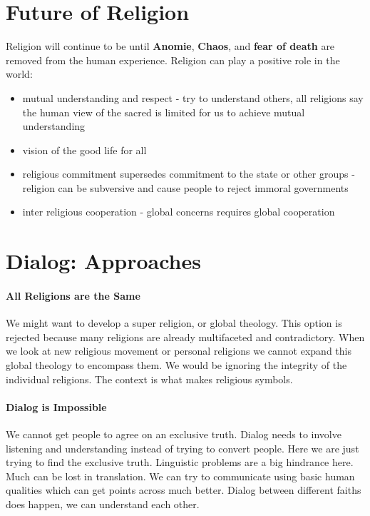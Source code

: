 \documentclass{article}
\begin{document}
\section*{Future of Religion}
\label{sec:future_of_religion}
Religion will continue to be until \textbf{Anomie}, \textbf{Chaos}, and \textbf{fear of death} are removed from the human experience. Religion can play a positive role in the world:
\begin{itemize}
	\item mutual understanding and respect - try to understand others, all religions say the human view of the sacred is limited for us to achieve mutual understanding
	\item vision of the good life for all
	\item religious commitment supersedes commitment to the state or other groups - religion can be subversive and cause people to reject immoral governments
	\item inter religious cooperation - global concerns requires global cooperation
\end{itemize}

\section*{Dialog: Approaches}
\label{sec:dialog_approaches}
\paragraph{All Religions are the Same}
\label{par:all_religions_are_the_same}
We might want to develop a super religion, or global theology. This option is rejected because many religions are already multifaceted and contradictory. When we look at new religious movement or personal religions we cannot expand this global theology to encompass them. We would be ignoring the integrity of the individual religions. The context is what makes religious symbols.

\paragraph{Dialog is Impossible}
\label{par:dialog_is_impossible}
We cannot get people to agree on an exclusive truth. Dialog needs to involve listening and understanding instead of trying to convert people. Here we are just trying to find the exclusive truth. Linguistic problems are a big hindrance here. Much can be lost in translation. We can try to communicate using basic human qualities which can get points across much better. Dialog between different faiths does happen, we can understand each other.
\end{document}
